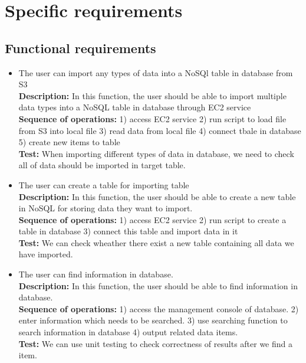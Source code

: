 \section{Specific requirements}
	\subsection{Functional requirements}
	\begin{itemize}
		\item The user can import any types of data into a NoSQl table in database from S3\\
        \textbf{Description:} In this function, the user should be able to import multiple data types into a NoSQL table in database through EC2 service\\
        \textbf{Sequence of operations:} 1) access EC2 service 2) run script to load file from S3 into local file 3) read data from local file 4) connect tbale in database 5) create new items to table\\
        \textbf{Test:} When importing different types of data in database, we need to check all of data should be imported in target table.\\
        
        \item The user can create a table for importing table\\
        \textbf{Description:} In this function, the user should be able to create a new table in NoSQL for storing data they want to import.\\
        \textbf{Sequence of operations:} 1) access EC2 service 2) run script to create a table in database 3) connect this table and import data in it\\
        \textbf{Test:} We can check wheather there exist a new table containing all data we have imported.\\
        
        \item The user can find information in database.\\
        \textbf{Description:} In this function, the user should be able to find information in database.\\ 
       \textbf{Sequence of operations:} 1) access the management console of database. 
        2) enter information which needs to be searched. 3) use searching function to search information in database 4) output related data items.\\ 
        \textbf{Test:} We can use unit testing to check correctness of results after we find a item.\\
        

\end{itemize}
